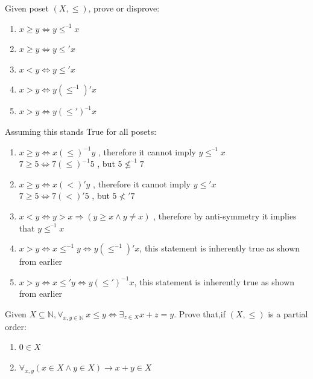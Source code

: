 \documentclass[12pt]{article}
\newcommand{\N}{\mathbb{N}}
\newenvironment{solution}[2][Solution]{ \begin{trivlist}
\item[\hskip \labelsep {\bfseries #1}]}{\end{trivlist}}
\newenvironment{problem}[2][Problem]{\begin{trivlist}
\item[\hskip \labelsep {\bfseries #1}\hskip \labelsep {\bfseries #2.}]}{\end{trivlist}}
\begin{document}
\vskip 0.1in
\pagebreak

\begin{problem}{9}
 Given poset $(X, \le)$, prove or disprove:
\item[]
\begin{enumerate}[label=\alph*)]
    \item $x \ge y \Leftrightarrow y \le^{\text{--}1} x$
    \item $x \ge y \Leftrightarrow y \le' x$
    \item $x < y \Leftrightarrow y \le' x$
    \item $x > y \Leftrightarrow y (\le^{\text{--}1})' x$
    \item $x > y \Leftrightarrow y (\le')^{\text{--}1} x$
\end{enumerate}
\end{problem}
\begin{solution}{9}
Assuming this stands True for all posets:
\begin{enumerate}[label=\alph*)]
    \item $x \ge y \Leftrightarrow x (\le)^{-1} y$ , therefore it cannot imply $y \le^{\text{--}1} x$ \\
    $7 \ge 5 \Leftrightarrow 7 (\le)^{-1} 5$ , but $5 \nleqslant^{\text{--}1} 7$
    \item $x \ge y \Leftrightarrow x (<)' y$ , therefore it cannot imply $y \le' x$ \\
    $7 \ge 5 \Leftrightarrow 7 (<)' 5$ , but $5 \nless' 7$
    \item $x < y \Leftrightarrow y > x \Rightarrow (y \geq x \wedge y \neq x)$ , therefore by anti-symmetry it implies that $y \le^{\text{--}1} x$
    \item $x > y \Leftrightarrow x \leq^{-1} y \Leftrightarrow y (\le^{-1})' x$, this statement is inherently true as shown from earlier
    \item $x > y \Leftrightarrow x \le' y \Leftrightarrow y (\le')^{-1} x$, this statement is inherently true as shown from earlier
\end{enumerate}
\end{solution}
\vskip 0.1in
\begin{problem}{10}Given $X \subseteq \N, \forall_{x,y\in\N}\ x \le y \Leftrightarrow \exists_{z \in X} x+z=y$. Prove that,if $(X,\le)$ is a partial order:
\item[]
\begin{enumerate}[label=\alph*)]
    \item $0 \in X$
    \item $\forall_{x,y} (x \in X \wedge y \in X) \rightarrow x + y \in X$
\end{enumerate}
\end{problem}
\end{document}
